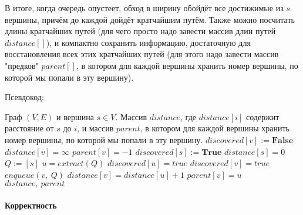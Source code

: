 \documentclass[a4paper,12pt]{article}
\begin{document}
В итоге, когда очередь опустеет, обход в ширину обойдёт все достижимые из $s$ вершины, причём до каждой дойдёт кратчайшим путём. Также можно посчитать длины кратчайших путей (для чего просто надо завести массив длин путей $distance[]$), и компактно сохранить информацию, достаточную для восстановления всех этих кратчайших путей (для этого надо завести массив "предков" $parent[]$, в котором для каждой вершины хранить номер вершины, по которой мы попали в эту вершину).

Псевдокод:

\begin{algorithm}
  	\caption{($(V, E), s$)}
    \begin{algorithmic}
		\Require Граф $(V, E)$ и вершина $s \in V$.
		\Ensure Массив $distance$, где $distance[i]$ содержит расстояние от $s$ до $i$, и массив $parent$, в котором для каждой вершины хранить номер вершины, по которой мы попали в эту вершину.
			\State $discovered[v] := \textbf{False}$
			\State $distance[v] = \infty$
			\State $parent[v] = -1$
		\EndFor
		\State $discovered[s] := \textbf{True}$
		\State $distance[s] = 0$
        \State $Q := [s]$
            \State $u = extract(Q)$
            \State $discovered[u] = true$
                    \State $discovered[v] = true$
                    \State $enqueue(v,\ Q)$
                    \State $distance[v] = distance[u] + 1$
                    \State $parent[v] = u$
                \EndIf
            \EndFor
        \EndWhile
		\State
		\Return $distance,\ parent$
	\end{algorithmic}
\end{algorithm}

\paragraph{Корректность}
\end{document}
